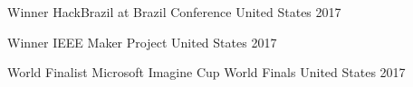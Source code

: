 


\begin{cvhonors}

  \cvhonor
    {Winner}
    {HackBrazil at Brazil Conference}
    {United States}
    {2017} %

  \cvhonor
    {Winner}
    {IEEE Maker Project}
    {United States}
    {2017} %

  \cvhonor
    {World Finalist}
    {Microsoft Imagine Cup World Finals}
    {United States}
    {2017} %
\end{cvhonors}




